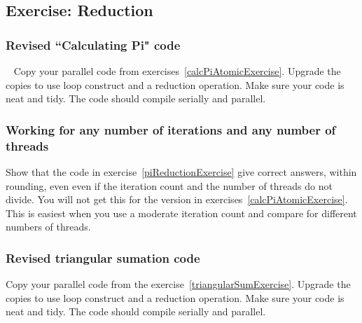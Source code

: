 \subsection{Exercise: Reduction}
\subsubsection{Revised ``Calculating Pi" code}~\label{piReductionExercise}
Copy your parallel code from exercises~\ref{calcPiAtomicExercise}.  
Upgrade the copies to use loop construct and a reduction operation.  Make sure your code is neat and tidy.  The code should compile serially and parallel.

\subsubsection{Working for any number of iterations and any number of threads}
Show that the code in exercise~\ref{piReductionExercise} give correct answers, within rounding, even even if the iteration count and the number of threads do not divide.  You will not get this for the version in exercises~\ref{calcPiAtomicExercise}.  This is easiest when you use a moderate iteration count and compare for different numbers of threads.

\subsubsection{Revised triangular sumation code}
Copy your parallel code from the exercise~\ref{triangularSumExercise}. Upgrade the copies to use loop construct and a reduction operation.  Make sure your code is neat and tidy.  The code should compile serially and parallel.

